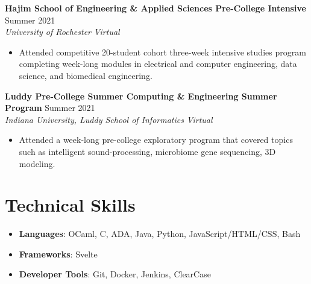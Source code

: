 \documentclass[letterpaper,8pt]{article}
\newcommand{\resumeEntry}[4]{
    \vspace{4pt}
    \large \textbf{#1}
    \normalsize \hfill #2
    \\
    \textit{#3} \hfill \textit{#4}
    \vspace{1pt}
}
\newcommand{\itemsBegin}{
    \begin{itemize}[leftmargin=0.2in, labelsep=0.05in, itemsep=0pt, parsep=1pt, topsep=0pt, partopsep=0pt]
}
\newcommand{\itemsEnd}{\end{itemize}}
\begin{document}
    \resumeEntry
        {Hajim School of Engineering \& Applied Sciences Pre-College Intensive}
        {Summer 2021}
        {University of Rochester}
        {Virtual}

    \itemsBegin
        \item Attended competitive 20-student cohort three-week intensive studies program completing week-long modules in electrical and computer engineering, data science, and biomedical engineering.
    \itemsEnd

    \resumeEntry
        {Luddy Pre-College Summer Computing \& Engineering Summer Program}
        {Summer 2021}
        {Indiana University, Luddy School of Informatics}
        {Virtual}

    \itemsBegin
        \item Attended a week-long pre-college exploratory program that covered topics such as intelligent sound-processing, microbiome gene sequencing, 3D modeling.
    \itemsEnd

\section{Technical Skills}

    \itemsBegin
        \item \textbf{Languages}{: OCaml, C, ADA, Java, Python, JavaScript/HTML/CSS, Bash}
        \item \textbf{Frameworks}{: Svelte}
        \item \textbf{Developer Tools}{: Git, Docker, Jenkins, ClearCase}
    \itemsEnd

\end{document}
